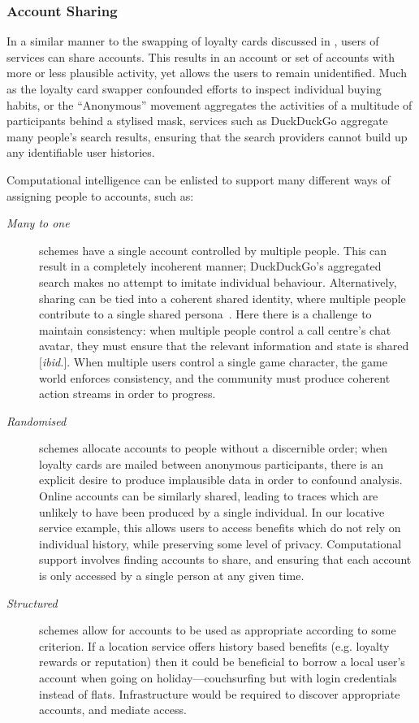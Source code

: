 \documentclass{IOS-Book-Article}     %
\newcommand{\tbox}[3][red]{{
\color{#1}\noindent{
   \fbox{\scriptsize{ {\bf #2} \textsl{#3}}}
   \vspace{2pt}
}
}}
\newcommand{\todo}[1]{\tbox{TODO:}{#1}}
\begin{document}
\subsubsection{Account Sharing}

In a similar manner to the swapping of loyalty cards discussed in
\cite{brunton2011vernacular}, users of services can share accounts. This
results in an account or set of accounts with more or less plausible activity,
yet allows the users to remain unidentified. 
Much as the loyalty card swapper confounded efforts to inspect individual
buying habits, or the ``Anonymous'' movement aggregates the activities of a
multitude of participants behind a stylised mask, services such as DuckDuckGo
aggregate many people's search results, ensuring that the search providers
cannot build up any identifiable user histories. 

Computational intelligence can be enlisted to support many different ways of assigning people to accounts,
 such as:
\begin{description}
  \item[\emph{Many to one}] schemes have a single account controlled by
  multiple people. This can result in a completely incoherent manner;
  DuckDuckGo's aggregated search makes no attempt to imitate
  individual behaviour. 
  Alternatively, sharing can be tied into a coherent shared identity,
   where multiple people contribute to a single shared
   persona~\cite{dalton2013Pseudonymity}.
   Here there is a challenge to maintain consistency: when multiple people
   control a call centre's chat avatar, they must ensure that the relevant
   information and state is shared [\emph{ibid.}]. When multiple users control a
   single game character, the game world enforces consistency, and the community
   must produce coherent action streams in order to progress.
   \item[\emph{Randomised}] schemes allocate accounts to people without a
   discernible order; when loyalty cards are mailed between anonymous
   participants, there is an explicit desire to produce implausible data in
   order to confound analysis. Online accounts can be similarly shared, leading
   to traces which are unlikely to have been produced by a single individual.
   In our locative service example, this allows users to access benefits which
   do not rely on individual history, while preserving some level of privacy.
   Computational support involves finding accounts to share, and ensuring that
   each account is only accessed by a single person at any given time.
   \item[\emph{Structured}] schemes allow for accounts to be used as appropriate
   according to some criterion. If a location service offers history based
   benefits (e.g. loyalty rewards or reputation) then it could be beneficial to
   borrow a local user's account when going on holiday---couchsurfing but with
   login credentials instead of flats. Infrastructure would be required to
   discover appropriate accounts, and mediate access. 
\end{description}
\end{document}
